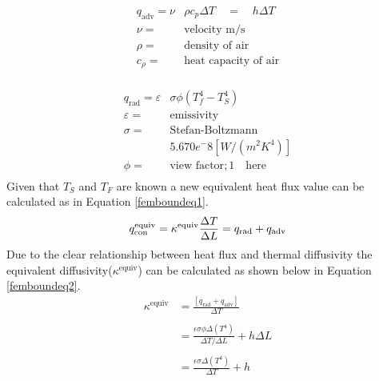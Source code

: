 	\begin{equation} \label{heatconeq}       
	       \begin{aligned}
	       q_{\text{adv}}= \nu &\rho c_p \Delta T \quad = \quad h \Delta T\\	      
	       \nu =& \text{velocity m/s}\\
	       \rho =& \text{density of air}\\
	       c_{\rho} =& \text{heat capacity of air}\\
          \end{aligned}
	\end{equation}
	       
	\begin{equation} \label{radeq}
	       \begin{aligned}
	       q_{\text{rad}} = \varepsilon&\sigma \phi \left(T_f^4 - T_S^4\right)\\
	       \varepsilon =& \text{emissivity}\\
	       \sigma =& \text{Stefan-Boltzmann} \\&5.670 e^-8 [W/(m^2K^4)]\\
	       \phi =& \text{view factor};1 \quad \text{here}\\
	       \end{aligned}
	\end{equation}
	Given that $T_S$ and $T_F$ are known a new equivalent heat flux value can be calculated as in Equation \ref{femboundeq1}.
	\begin{equation} \label{femboundeq1}
	q_{\text{con}}^{\text{equiv}} = \kappa^{\text{equiv}} \frac{\Delta T}{\Delta L} = q_{\text{rad}} + q_{\text{adv}}\\
	\end{equation}
	Due to the clear relationship between heat flux and thermal diffusivity the equivalent diffusivity($\kappa^{\text{equiv}}$) can be calculated as shown below in Equation \ref{femboundeq2}. 
	\begin{equation}\label{femboundeq2}
	\begin{aligned}
	\kappa^{\text{equiv}} &= \frac{\left[q_{\text{rad}} + q_{\text{adv}} \right]}{\Delta T}\\
	&\quad\\
	&= \frac{\epsilon \sigma \phi \Delta \left(T^4\right)}{\Delta T / \Delta L } + h \Delta L\\
	&\quad\\
	&= \frac{\epsilon \sigma \Delta \left(T^4\right)}{\Delta T   } + h\\
	\end{aligned}
	\end{equation}
	
